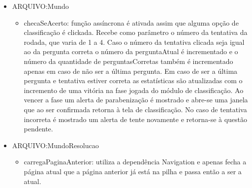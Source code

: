 \begin{itemize}
\item ARQUIVO:Mundo
	\begin{itemize}
	\item checaSeAcerto: função assíncrona é ativada assim que alguma opção de classificação é clickada. Recebe como parâmetro o número da tentativa da rodada, que varia de 1 a 4. Caso o número da tentativa clicada seja igual ao da pergunta correta o número da perguntaAtual é incrementado e o número da quantidade de perguntasCorretas também é incrementado apenas em caso de não ser a última pergunta. Em caso de ser a última pergunta e tentativa estiver correta as estatísticas são atualizadas com o incremento de uma vitória na fase jogada do módulo de classificação. Ao vencer a fase um alerta de parabenização é mostrado e abre-se uma janela que ao ser confirmada retorna à tela de classificação. No caso de tentativa incorreta é mostrado um alerta de tente novamente e retorna-se à questão pendente. 
	\end{itemize}
\end{itemize}

\begin{itemize}
\item ARQUIVO:MundoResolucao
	\begin{itemize}
	\item carregaPaginaAnterior: utiliza a dependência Navigation e apenas fecha a página atual que a página anterior já está na pilha e passa então a ser a atual.
	\end{itemize}
\end{itemize}


